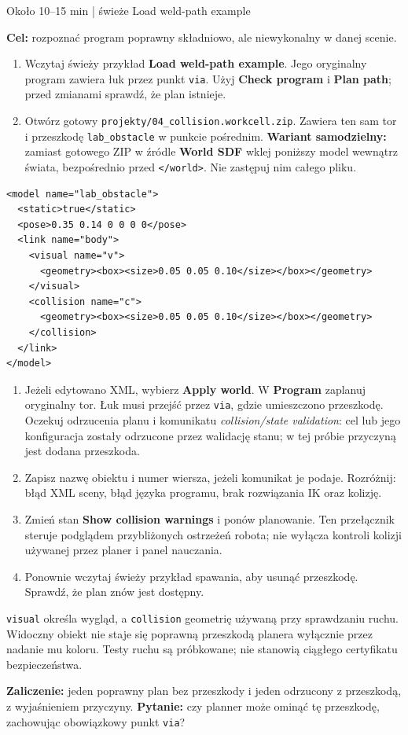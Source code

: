 \documentclass[10pt,a4paper]{article}
\newcommand{\ui}[1]{\textbf{\textsf{#1}}}
\newcommand{\cmd}[1]{\texttt{#1}}
\newcommand{\page}[2]{\clearpage{\Large\bfseries\color{navy}#1}\par{\small\color{accent}#2}\par\vspace{3pt}}
\begin{document}
\page{6. Przeszkoda: odróżnij błąd toru od błędu składni}{Około 10--15 min | świeże Load weld-path example}
\begin{goal}\textbf{Cel:} rozpoznać program poprawny składniowo, ale niewykonalny w danej scenie.\end{goal}
\begin{enumerate}
\item Wczytaj świeży przykład \ui{Load weld-path example}. Jego oryginalny program zawiera łuk przez punkt \cmd{via}. Użyj \ui{Check program} i \ui{Plan path}; przed zmianami sprawdź, że plan istnieje.
\item Otwórz gotowy \cmd{projekty/04\_collision.workcell.zip}. Zawiera ten sam tor i przeszkodę \cmd{lab\_obstacle} w punkcie pośrednim. \textbf{Wariant samodzielny:} zamiast gotowego ZIP w źródle \ui{World SDF} wklej poniższy model wewnątrz świata, bezpośrednio przed \cmd{</world>}. Nie zastępuj nim całego pliku.
\end{enumerate}
\begin{lstlisting}
<model name="lab_obstacle">
  <static>true</static>
  <pose>0.35 0.14 0 0 0 0</pose>
  <link name="body">
    <visual name="v">
      <geometry><box><size>0.05 0.05 0.10</size></box></geometry>
    </visual>
    <collision name="c">
      <geometry><box><size>0.05 0.05 0.10</size></box></geometry>
    </collision>
  </link>
</model>
\end{lstlisting}
\begin{enumerate}[resume]
\item Jeżeli edytowano XML, wybierz \ui{Apply world}. W \ui{Program} zaplanuj oryginalny tor. Łuk musi przejść przez \cmd{via}, gdzie umieszczono przeszkodę. Oczekuj odrzucenia planu i komunikatu \textit{collision/state validation}: cel lub jego konfiguracja zostały odrzucone przez walidację stanu; w tej próbie przyczyną jest dodana przeszkoda.
\item Zapisz nazwę obiektu i numer wiersza, jeżeli komunikat je podaje. Rozróżnij: błąd XML sceny, błąd języka programu, brak rozwiązania IK oraz kolizję.
\item Zmień stan \ui{Show collision warnings} i ponów planowanie. Ten przełącznik steruje podglądem przybliżonych ostrzeżeń robota; nie wyłącza kontroli kolizji używanej przez planer i panel nauczania.
\item Ponownie wczytaj świeży przykład spawania, aby usunąć przeszkodę. Sprawdź, że plan znów jest dostępny.
\end{enumerate}
\begin{remember}\cmd{visual} określa wygląd, a \cmd{collision} geometrię używaną przy sprawdzaniu ruchu. Widoczny obiekt nie staje się poprawną przeszkodą planera wyłącznie przez nadanie mu koloru. Testy ruchu są próbkowane; nie stanowią ciągłego certyfikatu bezpieczeństwa.\end{remember}
\textbf{Zaliczenie:} jeden poprawny plan bez przeszkody i jeden odrzucony z przeszkodą, z wyjaśnieniem przyczyny. \textbf{Pytanie:} czy planner może ominąć tę przeszkodę, zachowując obowiązkowy punkt \cmd{via}?
\end{document}
